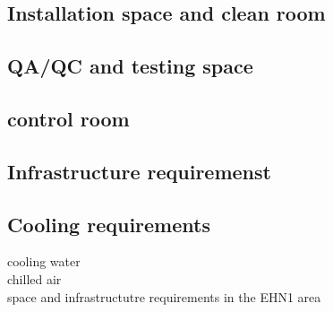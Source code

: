 
\subsection{Installation space and clean room}
\subsection{QA/QC and testing space}

\subsection{control room}


\subsection{Infrastructure requiremenst}

\subsection{Cooling requirements}
cooling water \\
chilled air\\



space and infrastructutre requirements in the EHN1 area

